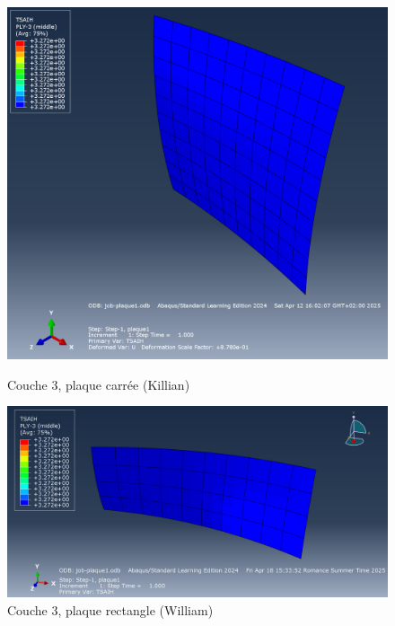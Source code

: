 \documentclass[a4paper,12pt]{article}
\begin{document}
\begin{figure}[h!]
	\centering
	\begin{minipage}{0.495\textwidth}
		\centering
		\includegraphics[width=\textwidth]{media/K_P1_L3_12042025.png} %
		\caption{Couche 3, plaque carrée (Killian)}
		\label{fig:image1}
	\end{minipage}
	\hfill
	\begin{minipage}{0.495\textwidth}
		\centering
		\includegraphics[width=\textwidth]{media/Couche3_.png} %
		\caption{Couche 3, plaque rectangle (William)}
		\label{fig:image2}
	\end{minipage}
\end{figure}
\end{document}
